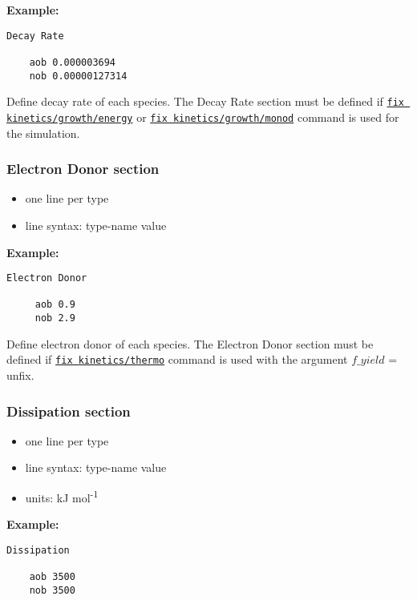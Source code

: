 \documentclass[11pt,a4paper,openright]{article}
\begin{document}
\textbf{Example:}
\begin{Verbatim}[frame=single]
 Decay Rate

    aob 0.000003694
    nob 0.00000127314

\end{Verbatim}

Define decay rate of each species.  The Decay Rate section must be defined if 
\hyperref[fkineticsenergy]{\tt fix kinetics/growth/energy} or \hyperref[fkineticsmonod]{\tt fix kinetics/growth/monod} 
command is used for the simulation. 

\newpage
\subsubsection{Electron Donor section}
\label{sed}
\begin{itemize} [nosep]
    \item one line per type
    \item line syntax: type-name {} value \\
    
\end{itemize} 

\textbf{Example:}
\begin{Verbatim}[frame=single]
 Electron Donor

     aob 0.9
     nob 2.9

\end{Verbatim}

Define electron donor of each species. 
The Electron Donor section must be defined if 
\hyperref[fkineticsthermo]{\tt fix kinetics/thermo} 
command is used with the argument $f\_yield$ = unfix. 


\subsubsection{Dissipation section}
\label{sdiss}
\begin{itemize} [nosep]
    \item one line per type
    \item line syntax: type-name {} value 
    \item units: kJ mol\textsuperscript{-1} \\  
    
\end{itemize} 

\textbf{Example:}
\begin{Verbatim}[frame=single]
 Dissipation

    aob 3500
    nob 3500

\end{Verbatim}
\end{document}
